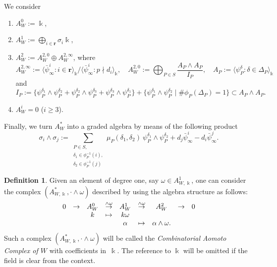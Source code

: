 \documentclass[11pt]{amsart}
\def\kk{\Bbbk}
\def\w{\omega}
\def\rightmap#1{\smash{\mathop{\rightarrow}\limits^{#1}}}
\theoremstyle{plain}
\theoremstyle{definition}
\newtheorem{definition}[thm]{Definition}
\begin{document}
We consider
\begin{enumerate}
\item $A_W^0:=\kk$,
\item
$A_W^1:=\bigoplus_{i\in \mathbf r} \sigma_i\kk$,
\item
$A_W^2:=A_W^{2,0}\oplus A_W^{2,\infty}$, where
$$
A_W^{2,\infty}:=\langle \bar\psi^i_\infty : i\in\mathbf{r}\rangle_\kk/\langle \bar\psi^i_\infty: p\nmid d_i \rangle_\kk,\quad
A_W^{2,0}:=\bigoplus_{P\in S} \frac{A_P\wedge A_P}{I_P},\quad
A_P:=\langle \psi_P^\delta : \delta\in \Delta_P\rangle_\kk
$$
and
\begin{equation}
\label{eq-ip}
I_P:=\{
\psi_P^{\delta_1}\wedge \psi_P^{\delta_2}+\psi_P^{\delta_2}\wedge \psi_P^{\delta_3}+
\psi_P^{\delta_3}\wedge \psi_P^{\delta_1}\}+
\{\psi_P^{\delta_1}\wedge \psi_P^{\delta_2}\mid \#\phi_P(\Delta_P)=1\}\subset A_P\wedge A_P.
\end{equation}
\item $A_W^i=0$ ($i\geq 3$).
\end{enumerate}
Finally, we turn $A^*_W$ into a graded algebra by means of the following product
\begin{equation}
\label{eq-prod}
\sigma_i\wedge \sigma_j:=
\sum_{\substack{P \in S,\\  \delta_1\in\phi_P^{-1}(i),\\ \delta_2\in\phi_P^{-1}(j)}}
\mu_P(\delta_1,\delta_2)\ \psi_P^{\delta_1}\wedge \psi_P^{\delta_2}
+d_j\bar\psi_\infty^i-d_i\bar\psi_\infty^j.
\end{equation}

\begin{definition}
\label{def:GAComplex}
Given an element of degree one, say $\omega\in A_{W,\kk}^1$, one can consider the complex
$(A_{W,\kk}^*,\cdot\wedge\w)$ described by using the algebra structure as follows:
\begin{equation}
\label{eq:GAComplex}
\array{ccccccccc}
0 & \to & A_W^0 & \rightmap{\wedge \omega} & A_W^1 & \rightmap{\wedge \omega} & A_W^2 & \to & 0\\
&& k & \mapsto & k\omega &&&&\\
&&&& \alpha & \mapsto & \alpha \wedge \omega. &&
\endarray
\end{equation}
Such a complex $(A^*_{W,\kk},\cdot\wedge\w)$ will be called the \emph{Combinatorial Aomoto Complex of $W$} with coefficients in~$\kk$. The reference to $\kk$ will be omitted if the field is clear from the context.
\end{definition}
\end{document}
